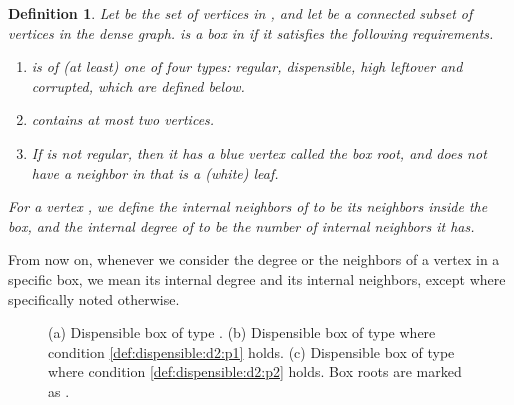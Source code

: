 \documentclass[11pt]{article}
\def\dnsitem{\vspace{-7pt}\item}
\newtheorem{definition}[theorem]{Definition}
\theoremstyle{definition}
\begin{document}
\begin{definition}
\label{def:box_general}
Let  be the set of vertices in , and let  be a connected subset of vertices in the dense graph.
 is a \emph{box} in  if it satisfies the following requirements.
\begin{enumerate}
	\dnsitem  is of (at least) one of four types: \emph{regular}, \emph{dispensible}, \emph{high leftover} and \emph{corrupted}, which are defined below.
	\dnsitem  contains at most two  vertices.
	\dnsitem If  is not regular, then it has a blue vertex  called the \emph{box root}, and  does not have a neighbor in  that is a (white) leaf. 
\end{enumerate}
For a vertex , we define the \emph{internal neighbors} of  to be its neighbors inside the box, and the \emph{internal degree} of  to be the number of internal neighbors it has.
\end{definition}

From now on,
whenever we consider the degree or the neighbors of a vertex in a specific box, 
we mean its internal degree and its internal neighbors, 
except where specifically noted otherwise.

\begin{figure}[thbp]
  \caption{\sf (a) Dispensible box of type . 
	      (b) Dispensible box of type  where condition \ref{def:dispensible:d2:p1} holds.
	      (c) Dispensible box of type  where condition \ref{def:dispensible:d2:p2} holds.
	      Box roots are marked as .}
  \medskip
  \centering
  \label{fig:dispensible}
\end{figure}
\end{document}
